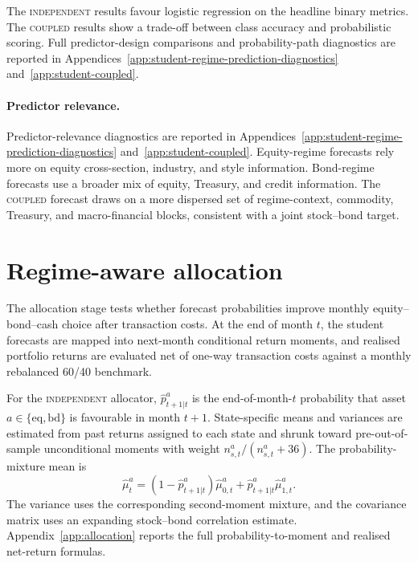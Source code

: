 ﻿\documentclass[10pt]{article}
\newcommand{\Acoup}{\textsc{coupled}}
\newcommand{\Bindep}{\textsc{independent}}
\begin{document}
The \Bindep{} results favour logistic regression on the headline binary metrics. The
\Acoup{} results show a trade-off between class accuracy and probabilistic scoring. Full
predictor-design comparisons and probability-path diagnostics are reported in
Appendices~\ref{app:student-regime-prediction-diagnostics} and~\ref{app:student-coupled}.

\paragraph{Predictor relevance.}
Predictor-relevance diagnostics are reported in Appendices~\ref{app:student-regime-prediction-diagnostics}
and~\ref{app:student-coupled}. Equity-regime forecasts rely more on equity cross-section,
industry, and style information. Bond-regime forecasts use a broader mix of equity,
Treasury, and credit information. The \Acoup{} forecast draws on a more dispersed set of
regime-context, commodity, Treasury, and macro-financial blocks, consistent with a joint
stock--bond target.

\section{Regime-aware allocation}
\label{sec:alloc}

The allocation stage tests whether forecast probabilities improve monthly equity--bond--cash
choice after transaction costs. At the end of month \(t\), the student forecasts are mapped
into next-month conditional return moments, and realised portfolio returns are evaluated net
of one-way transaction costs against a monthly rebalanced 60/40 benchmark.

For the \Bindep{} allocator, \(\hat p^{a}_{t+1|t}\) is the end-of-month-\(t\) probability
that asset \(a\in\{\mathrm{eq},\mathrm{bd}\}\) is favourable in month \(t+1\). State-specific
means and variances are estimated from past returns assigned to each state and shrunk toward
pre-out-of-sample unconditional moments with weight \(n^a_{s,t}/(n^a_{s,t}+36)\). The
probability-mixture mean is
\begin{equation}
    \hat\mu^a_t
    =
    (1-\hat p^a_{t+1|t})\hat\mu^a_{0,t}
    +
    \hat p^a_{t+1|t}\hat\mu^a_{1,t}.
    \label{eq:independent-allocation-mean}
\end{equation}
The variance uses the corresponding second-moment mixture, and the covariance matrix uses an
expanding stock--bond correlation estimate. Appendix~\ref{app:allocation} reports the full
probability-to-moment and realised net-return formulas.
\end{document}
